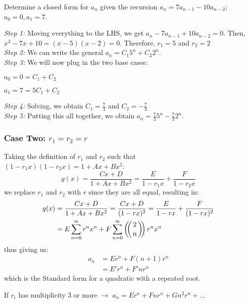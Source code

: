 \begin{example}{}
    Determine a closed form for $a_n$ given the recursion $a_n = 7a_{n-1} - 10a_{n-2}$; $a_0 = 0, a_1 = 7$. 
\end{example}

\begin{solution}

\textit{Step 1:} Moving everything to the LHS, we get $a_n - 7a_{n-1} + 10 a_{n-2} = 0$. 
Then, $x^2 - 7x + 10 = (x-5)(x-2) = 0$. Therefore, $r_1 = 5$ and $r_2 = 2$ \\

\textit{Step 2:} We can write the general $a_n = C_1 5^n + C_2 2^n$. \\

\textit{Step 3:} We will now plug in the two base cases:

\qquad $a_0 = 0 = C_1 + C_2$

\qquad $a_1 = 7 = 5 C_1 + C_2$
\newline 

\textit{Step 4:} Solving, we obtain $C_1 = \frac 73$ and $C_2 = - \frac 73$\\

\textit{Step 5:} Putting this all together, we obtain $\boxed{a_n = \frac 73 5^n - \frac 73 2^n}$. 

\end{solution}

\subsubsection*{Case Two: $r_1 = r_2 = r$}
Taking the definition of $r_1$ and $r_2$ such that $(1 - r_1x)(1-r_2x) = 1 + Ax + Bx^2$: 
\[
  g(x) = \frac{Cx + D}{1 + Ax + Bx^2} = \frac E{1-r_1 x} + \frac F {1-r_2x}
\]
we replace $r_1$ and $r_2$ with $r$ since they are all equal, resulting in:
\begin{align*}
    g(x) &= \frac{Cx+D}{1 + Ax + Bx^2} = \frac{Cx + D}{(1-rx)^2} = \frac E{1-rx} + \frac F{(1-rx)^2}\\
    &= E \sum_{n=0}^\infty r^n x^n + F \sum_{n=0}^\infty \snb 2 n r^n x^n
\end{align*}
thus giving us: 
\begin{align*}
    a_n &= Er^n + F(n+1)r^n \\ &= E' r^n + F' nr^n
\end{align*}
which is the Standard form for a quadratic with a repeated root. 
\begin{remark}
    If $r_i$ has multiplicity 3 or more $\rightarrow$ $a_n = E r^n + F n r^n + G n^2 r^n + \dots$
\end{remark}

